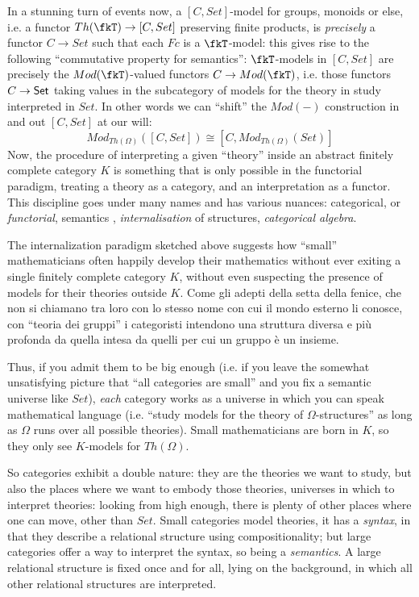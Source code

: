 In a stunning turn of events now, a $[C,Set]$-model for groups, monoids or else, i.e. a functor $Th(\fkT)\to [C,Set]$ preserving finite products, is \emph{precisely} a functor $C\to Set$ such that each $Fc$ is a $\fkT$-model: this gives rise to the following ``commutative property for semantics'': $\fkT$-models in $[C,Set]$ are precisely the $Mod(\fkT)$-valued functors $C\to Mod(\fkT)$, i.e. those functors $C \to \mathsf{Set}$ taking values in the subcategory of models for the theory in study interpreted in $Set$. In other words we can ``shift'' the $Mod(-)$ construction in and out $[C,Set]$ at our will:
\[
	Mod_{Th(\Omega)}([C,Set]) \cong [C, Mod_{Th(\Omega)}(Set)]
\]
Now, the procedure of interpreting a given ``theory'' inside an abstract finitely complete category $K$ is something that is only possible in the functorial paradigm, treating a theory as a category, and an interpretation as a functor. This discipline goes under many names and has various nuances: categorical, or \emph{functorial}, semantics \cite{lawvere1963functorial}, \emph{internalisation} of structures, \emph{categorical algebra}.

The internalization paradigm sketched above suggests how ``small'' mathematicians often happily develop their mathematics without ever exiting a single finitely complete category $K$, without even suspecting the presence of models for their theories outside $K$. Come gli adepti della setta della fenice, che non si chiamano tra loro con lo stesso nome con cui il mondo esterno li conosce, con ``teoria dei gruppi'' i categoristi intendono una struttura diversa e più profonda da quella intesa da quelli per cui un gruppo è un insieme.

Thus, if you admit them to be big enough (i.e. if you leave the somewhat unsatisfying picture that ``all categories are small'' and you fix a semantic universe like $Set$), \emph{each} category works as a universe in which you can speak mathematical language (i.e. ``study models for the theory of $\Omega$-structures'' as long as $\Omega$ runs over all possible theories). Small mathematicians are born in $K$, so they only see $K$-models for $Th(\Omega)$.

So categories exhibit a double nature: they are the theories we want to study, but also the places where we want to embody those theories, universes in which to interpret theories: looking from high enough, there is plenty of other places where one can move, other than $Set$. Small categories model theories, it has a \emph{syntax}, in that they describe a relational structure using compositionality; but large categories offer a way to interpret the syntax, so being a \emph{semantics}. A large relational structure is fixed once and for all, lying on the background, in which all other relational structures are interpreted.

